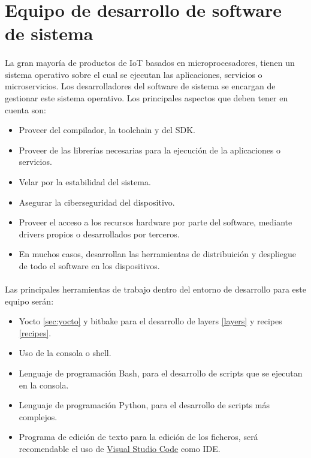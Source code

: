\section{Equipo de desarrollo de software de sistema}\label{sec:systemteam}

\paragraph{}La gran mayoría de productos de \gls{IoT} basados en microprocesadores,
tienen un sistema operativo sobre el cual se ejecutan las aplicaciones, servicios o
microservicios. Los desarrolladores del software de sistema se encargan de gestionar
este sistema operativo. Los principales aspectos que deben tener en cuenta son:

\begin{itemize}
    \item Proveer del compilador, la toolchain y del \gls{SDK}.
    \item Proveer de las librerías necesarias para la ejecución de la aplicaciones o
    servicios.
    \item Velar por la estabilidad del sistema.
    \item Asegurar la ciberseguridad del dispositivo.
    \item Proveer el acceso a los recursos hardware por parte del software, mediante
    drivers propios o desarrollados por terceros.
    \item En muchos casos, desarrollan las herramientas de distribuición y despliegue
    de todo el software en los dispositivos.
\end{itemize}

\paragraph{}Las principales herramientas de trabajo dentro del entorno de desarrollo
para este equipo serán:

\begin{itemize}
    \item Yocto \ref{sec:yocto} y bitbake para el desarrollo de layers \ref{layers} y
    recipes \ref{recipes}.
    \item Uso de la consola o \gls{shell}.
    \item Lenguaje de programación Bash, para el desarrollo de \gls{scripts} que se
    ejecutan en la consola.
    \item Lenguaje de programación Python, para el desarrollo de \gls{scripts} más complejos.
    \item Programa de edición de texto para la edición de los ficheros, será recomendable
    el uso de \hyperref[sec:vscode]{Visual Studio Code} como \gls{IDE}.
\end{itemize}


